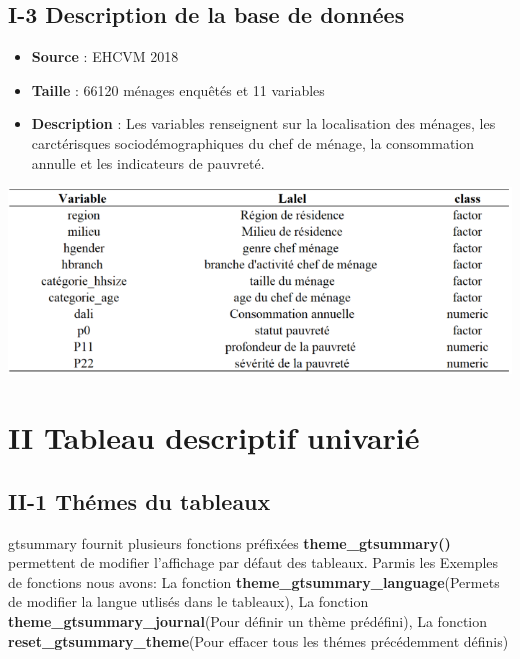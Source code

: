 \documentclass[
]{article}
\providecommand{\tightlist}{%
  \setlength{\itemsep}{0pt}\setlength{\parskip}{0pt}}
\begin{document}
\hypertarget{i-3-description-de-la-base-de-donnuxe9es}{%
\subsection{I-3 Description de la base de
données}\label{i-3-description-de-la-base-de-donnuxe9es}}

\begin{itemize}
\tightlist
\item
  \textbf{Source} : EHCVM 2018
\item
  \textbf{Taille} : 66120 ménages enquêtés et 11 variables
\item
  \textbf{Description} : Les variables renseignent sur la localisation
  des ménages, les carctérisques sociodémographiques du chef de ménage,
  la consommation annulle et les indicateurs de pauvreté.
\end{itemize}

\includegraphics[width=9.72in]{../img/liste_var_}

\hypertarget{ii-tableau-descriptif-univariuxe9}{%
\section{II Tableau descriptif
univarié}\label{ii-tableau-descriptif-univariuxe9}}

\hypertarget{ii-1-thuxe9mes-du-tableaux}{%
\subsection{II-1 Thémes du tableaux}\label{ii-1-thuxe9mes-du-tableaux}}

gtsummary fournit plusieurs fonctions préfixées
\textbf{theme\_gtsummary()} permettent de modifier l'affichage par
défaut des tableaux. Parmis les Exemples de fonctions nous avons: La
fonction \textbf{theme\_gtsummary\_language}(Permets de modifier la
langue utlisés dans le tableaux), La fonction
\textbf{theme\_gtsummary\_journal}(Pour définir un thème prédéfini), La
fonction \textbf{reset\_gtsummary\_theme}(Pour effacer tous les thémes
précédemment définis)
\end{document}
